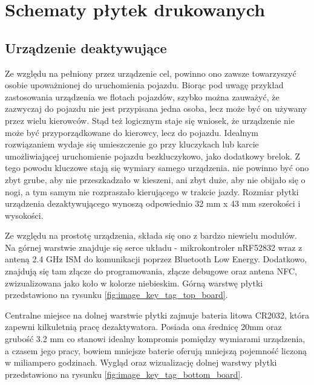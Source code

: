 \chapter{Schematy płytek drukowanych}
\label{boards}

\section{Urządzenie deaktywujące}

Ze względu na pełniony przez urządzenie cel, powinno ono zawsze towarzyszyć osobie upoważnionej do uruchomienia pojazdu. Biorąc pod uwagę przykład zastosowania urządzenia we flotach pojazdów, szybko można zauważyć, że zazwyczaj do pojazdu nie jest przypisana jedna osoba, lecz może być on używany przez wielu kierowców. Stąd też logicznym staje się wniosek, że urządzenie nie może być przyporządkowane do kierowcy, lecz do pojazdu. Idealnym rozwiązaniem wydaje się umieszczenie go przy kluczykach lub karcie umożliwiającej uruchomienie pojazdu bezkluczykowo, jako dodatkowy brelok. Z tego powodu kluczowe stają się wymiary samego urządzenia. nie powinno być ono zbyt grube, aby nie przeszkadzało w kieszeni, ani zbyt duże, aby nie obijało się o nogi, a tym samym nie rozpraszało kierującego w trakcie jazdy.
Rozmiar płytki urządzenia dezaktywującego wynoszą odpowiednio 32 mm x 43 mm szerokości i wysokości.

Ze względu na prostotę urządzenia, składa się ono z bardzo niewielu modułów.
Na górnej warstwie znajduje się serce układu - mikrokontroler nRF52832 wraz z anteną 2.4 GHz ISM do komunikacji poprzez Bluetooth Low Energy. Dodatkowo, znajdują się tam złącze do programowania, złącze debugowe oraz antena NFC, zwizualizowana jako koło w kolorze niebieskim. Górną warstwę płytki przedstawiono na rysunku \ref{fig:image_key_tag_top_board}.

Centralne miejsce na dolnej warstwie płytki zajmuje bateria litowa CR2032, która zapewni kilkuletnią pracę dezaktywatora. Posiada ona średnicę 20mm oraz grubość 3.2 mm co stanowi idealny kompromis pomiędzy wymiarami urządzenia, a czasem jego pracy, bowiem mniejsze baterie oferują mniejszą pojemność liczoną w miliampero godzinach. Wygląd oraz wizualizację dolnej warstwy płytki przedstawiono na rysunku \ref{fig:image_key_tag_bottom_board}.

